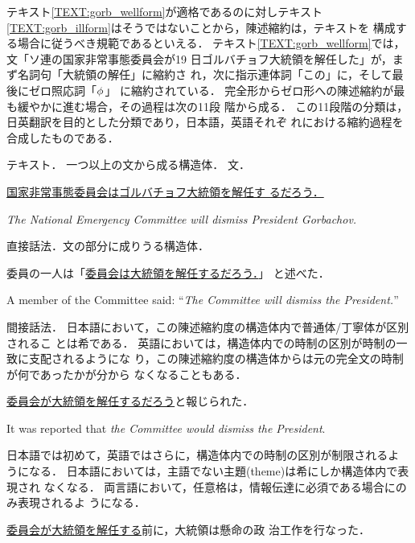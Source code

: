 テキスト\ref{TEXT:gorb_wellform}が適格であるのに対しテキスト
\ref{TEXT:gorb_illform}はそうではないことから，陳述縮約は，テキストを
構成する場合に従うべき規範であるといえる．
テキスト\ref{TEXT:gorb_wellform}では，文「ソ連の国家非常事態委員会が19
日ゴルバチョフ大統領を解任した」が，まず名詞句「大統領の解任」に縮約さ
れ，次に指示連体詞「この」に，そして最後にゼロ照応詞「$\phi_{}$」
に縮約されている．
完全形からゼロ形への陳述縮約が最も緩やかに進む場合，その過程は次の11段
階から成る．
この11段階の分類は，日英翻訳を目的とした分類であり，日本語，英語それぞ
れにおける縮約過程\cite{Jelinek65,Jelinek66}を合成したものである．
\begin{DEPRED}
\depred テキスト．
一つ以上の文から成る構造体．
\depred 文．
\vspace{-0.1mm}
\begin{DEPEX}
\depexample \underline{国家非常事態委員会はゴルバチョフ大統領を解任す
るだろう．}

{\it The National Emergency Committee will dismiss President
Gorbachov.}
\end{DEPEX}
\depred 直接話法．文の部分に成りうる構造体．
\vspace{-0.1mm}
\begin{DEPEX}
\depexample 委員の一人は「\underline{委員会は大統領を解任するだろう．}」
と述べた．

A member of the Committee said: ``{\it The Committee will dismiss the
President.}''
\end{DEPEX}
\depred 間接話法．
日本語において，この陳述縮約度の構造体内で普通体/丁寧体が区別されるこ
とは希である．
英語においては，構造体内での時制の区別が時制の一致に支配されるようにな
り，この陳述縮約度の構造体からは元の完全文の時制が何であったかが分から
なくなることもある．

\vspace{-0.1mm}
\begin{DEPEX}
\depexample \underline{委員会が大統領を解任するだろう}と報じられた．

It was reported that {\it the Committee would dismiss the President}. 
\end{DEPEX}
\depred
日本語では初めて，英語ではさらに，構造体内での時制の区別が制限されるよ
うになる．
日本語においては，主語でない主題(theme)は希にしか構造体内で表現され
なくなる．
両言語において，任意格は，情報伝達に必須である場合にのみ表現されるよ
うになる．
\vspace{-0.1mm}
\begin{DEPEX}
\depexample \underline{委員会が大統領を解任する}前に，大統領は懸命の政
治工作を行なった．


\end{DEPEX}
\end{DEPRED}

